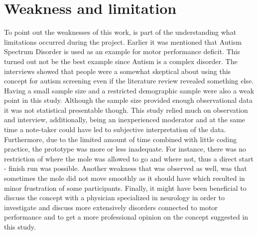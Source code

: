 \section{Weakness and limitation}


To point out the weaknesses of this work, is part of the understanding what limitations occurred during the project.
Earlier it was mentioned that Autism Spectrum Disorder is used as an example for motor performance deficit. This turned out not be the best example since Autism is a complex disorder. The interviews showed that people were a somewhat skeptical about using this concept for autism screening even if the literature review revealed something else. Having a small sample size and a restricted demographic sample were also a weak point in this study. Although the sample size provided enough observational data it was not statistical presentable though. This study relied much on observation and interview, additionally, being an inexperienced moderator and at the same time a note-taker could have led to subjective interpretation of the data. Furthermore, due to the limited amount of time combined with little coding practice, the prototype was more or less inadequate. For instance, there was no restriction of where the mole was allowed to go and where not, thus a direct start - finish run was possible. Another weakness that was observed as well, was that sometimes the mole did not move smoothly as it should have which resulted in minor frustration of some participants.
Finally, it might have been beneficial to discuss the concept with a physician specialized in neurology in order to investigate and discuss more extensively disorders connected to motor performance and to get a more professional opinion on the concept suggested in this study. 
